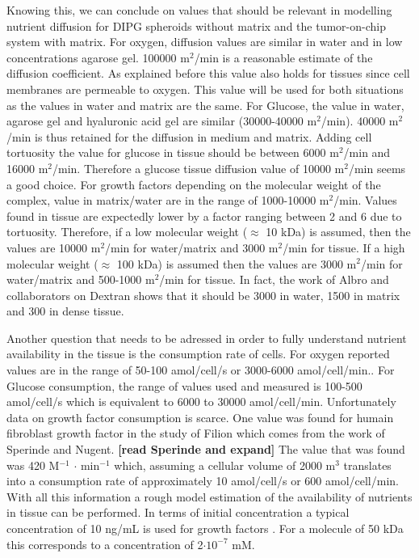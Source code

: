 \documentclass[11pt,a4paper]{article}
\begin{document}
Knowing this, we can conclude on values that should be relevant in modelling nutrient diffusion for DIPG spheroids without matrix and the tumor-on-chip system with matrix. For oxygen, diffusion values are similar in water and in low concentrations agarose gel. 100000 \textmu m$^2$/min is a reasonable estimate of the diffusion coefficient. As explained before this value also holds for tissues since cell membranes are permeable to oxygen. This value will be used for both situations as the values in water and matrix are the same. For Glucose, the value in water, agarose gel and hyaluronic acid gel are similar (30000-40000 \textmu m$^2$/min). 40000 \textmu m$^2$/min is thus retained for the diffusion in medium and matrix. Adding cell tortuosity the value for glucose in tissue should be between 6000 \textmu m$^2$/min and 16000 \textmu m$^2$/min. Therefore a glucose tissue diffusion value  of 10000 \textmu m$^2$/min seems a good choice. For growth factors depending on the molecular weight of the complex, value in matrix/water are in the range of 1000-10000 \textmu m$^2$/min. Values found in tissue are expectedly lower by a factor ranging between 2 and 6 due to tortuosity. Therefore, if a low molecular weight ($\approx$ 10 kDa) is assumed, then the values are 10000 \textmu m$^2$/min for water/matrix and 3000 \textmu m$^2$/min for tissue. If a high molecular weight ($\approx$ 100 kDa)  is assumed then the values are 3000 \textmu m$^2$/min for water/matrix and 500-1000 \textmu m$^2$/min for tissue. In fact, the work of Albro and collaborators on Dextran shows that it should be 3000 in water, 1500 in matrix and 300 in dense tissue.\cite{Albro2009}

Another question that needs to be adressed in order to fully understand nutrient availability in the tissue is the consumption rate of cells. For oxygen reported values are in the range of 50-100 amol/cell/s or 3000-6000 amol/cell/min.\cite{Nelson2017}\cite{Kempf2005}\cite{Mao2018}. For Glucose consumption, the range of values used and measured is 100-500 amol/cell/s which is equivalent to 6000 to 30000 amol/cell/min\cite{Mao2018}\cite{Kempf2005}\cite{Cleri2019}\cite{Jagiella2016}. Unfortunately data on growth factor consumption is scarce. One value was found for humain fibroblast growth factor in the study of Filion which comes from the work of Sperinde and Nugent.\cite{Filion2004}\cite{Sperinde2000} \textbf{[read Sperinde and expand]} The value that was found was 420 \textmu M$^{-1}$ $\cdot$ min$^{-1}$ which, assuming a cellular volume of 2000 \textmu m$^3$ translates into a consumption rate of approximately 10 amol/cell/s or 600 amol/cell/min. With all this information a rough model estimation of the availability of nutrients in tissue can be performed. In terms of initial concentration a typical concentration of 10 ng/mL is used for growth factors \cite{Meel2018}. For a molecule of 50 kDa this corresponds to a concentration of 2$\cdot 10^{-7}$ mM.
\end{document}
